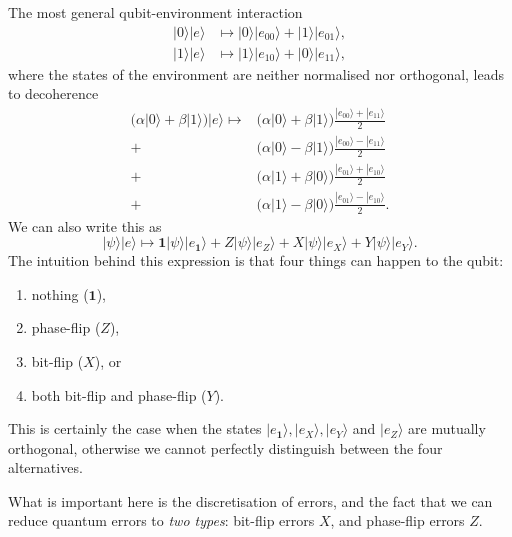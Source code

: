 \documentclass[fleqn]{article}
\providecommand{\tightlist}{%
  \setlength{\itemsep}{0pt}\setlength{\parskip}{0pt}}
\newenvironment{idea}{\noindent}{\medskip}
\begin{document}
The most general qubit-environment interaction
\[
  \begin{aligned}
    |0\rangle|e\rangle &\longmapsto |0\rangle|e_{00}\rangle + |1\rangle|e_{01}\rangle,
  \\|1\rangle|e\rangle &\longmapsto |1\rangle|e_{10}\rangle + |0\rangle|e_{11}\rangle,
  \end{aligned}
\]
where the states of the environment are neither normalised nor orthogonal, leads to decoherence
\[
  \begin{aligned}
    \Big( \alpha|0\rangle + \beta|1\rangle \Big) |e\rangle \longmapsto
    & \Big( \alpha|0\rangle + \beta|1\rangle \Big) \frac{|e_{00}\rangle+|e_{11}\rangle}{2}
  \\+& \Big( \alpha|0\rangle - \beta|1\rangle \Big) \frac{|e_{00}\rangle-|e_{11}\rangle}{2}
  \\+& \Big( \alpha|1\rangle + \beta|0\rangle \Big) \frac{|e_{01}\rangle+|e_{10}\rangle}{2}
  \\+& \Big( \alpha|1\rangle - \beta|0\rangle \Big) \frac{|e_{01}\rangle-|e_{10}\rangle}{2}.
  \end{aligned}
\]
We can also write this as
\[
|\psi\rangle|e\rangle \longmapsto  \mathbf{1}|\psi\rangle|e_{\mathbf{1}}\rangle + Z|\psi\rangle |e_Z\rangle +X|\psi\rangle |e_X\rangle + Y|\psi\rangle |e_Y\rangle.
\]
The intuition behind this expression is that four things can happen to the qubit:

\begin{enumerate}
\def\labelenumi{\arabic{enumi}.}
\tightlist
\item
  nothing (\(\mathbf{1}\)),
\item
  phase-flip (\(Z\)),
\item
  bit-flip (\(X\)), or
\item
  both bit-flip and phase-flip (\(Y\)).
\end{enumerate}

This is certainly the case when the states \(|e_{\mathbf{1}}\rangle, |e_X\rangle, |e_Y\rangle\) and \(|e_Z\rangle\) are mutually orthogonal, otherwise we cannot perfectly distinguish between the four alternatives.

\begin{idea}

What is important here is the discretisation of errors, and the fact that we can reduce quantum errors to \emph{two types}: bit-flip errors \(X\), and phase-flip errors \(Z\).

\end{idea}
\end{document}
